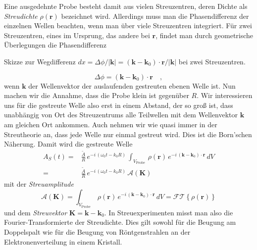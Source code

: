 Eine ausgedehnte Probe besteht damit aus vielen Streuzentren, deren Dichte als \emph{Streudichte} $\rho(\mathbf{r})$ bezeichnet wird. Allerdings muss man die Phasendifferenz der einzelnen Wellen beachten, wenn man über viele Streuzentren integriert. Für zwei Streuzentren, eines im Ursprung, das andere bei $\mathbf{r}$, findet man durch geometrische Überlegungen die Phasendifferenz
%
\begin{marginfigure}
\caption{Skizze zur  Wegdifferenz $dx =  \Delta \phi / | \mathbf{k}|=  ( \mathbf{k} - \mathbf{k}_0 ) \cdot \mathbf{r} / |\mathbf{k}| $ bei zwei Streuzentren.}
\end{marginfigure}
%
\begin{equation}
\Delta \phi = ( \mathbf{k} - \mathbf{k}_0 ) \cdot \mathbf{r} \quad ,
\end{equation}
wenn $\mathbf{k}$ der Wellenvektor der auslaufenden gestreuten ebenen Welle ist. Nun machen wir die Annahme, dass die Probe klein ist gegenüber $R$. Wir interessieren uns für die gestreute Welle also erst in einem Abstand, der so groß ist, dass unabhängig von Ort des Streuzentrums alle Teilwellen mit dem Wellenvektor $\mathbf{k}$ am gleichen Ort ankommen. Auch nehmen wir wie quasi immer in der Streutheorie an, dass jede Welle nur einmal gestreut wird. Dies ist die  Born'schen Näherung. Damit wird die gestreute Welle
\begin{align}
 A_S(t) = & \frac{\tilde{A}}{R} \,   e^{- i \, (\omega_0 t - k_0 R)} \,
  \int_{V_\text{Probe}} \, \rho( \mathbf{r}) \,   e^{- i \,  ( \mathbf{k} - \mathbf{k}_0 ) \cdot \mathbf{r}} \, dV \\
  = & \frac{\tilde{A}}{R} \,   e^{- i \, (\omega_0 t - k_0 R)} \, \mathcal{A}(\mathbf{K}) 
\end{align}
mit der \emph{Streuamplitude} 
\begin{equation}
\mathcal{A}(\mathbf{K}) =  \int_{V_\text{Probe}} \, \rho( \mathbf{r}) \,   e^{- i \,  ( \mathbf{k} - \mathbf{k}_0 ) \cdot \mathbf{r}} \, dV  = \mathcal{FT} \left\{ \rho( \mathbf{r})  \right\} \label{eq:rezi_streuamplitude}
\end{equation}
und dem \emph{Streuvektor} $\mathbf{K} = \mathbf{k} - \mathbf{k}_0$. In Streuexperimenten misst man also die Fourier-Transformierte der Streudichte. Dies gilt sowohl für die Beugung am Doppelspalt wie für die Beugung von Röntgenstrahlen an der Elektronenverteilung in einem Kristall. 

